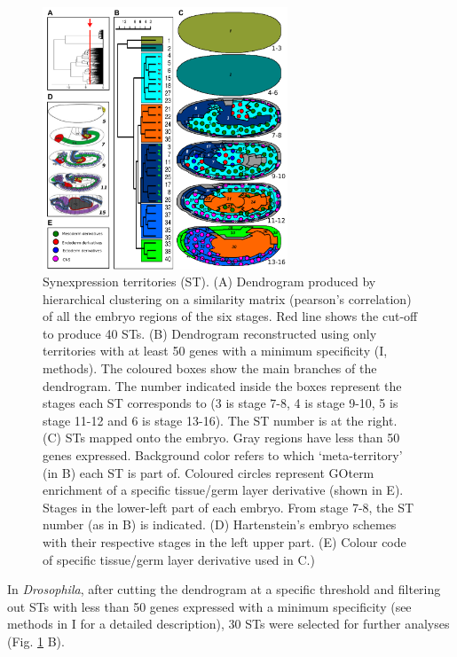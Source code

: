 \begin{figure}[!t]
  \includegraphics[width=0.65\textwidth]{./Images/Art-I/territories.png}
  \centering
  \caption{Synexpression territories (ST). (A) Dendrogram produced by hierarchical clustering on a similarity matrix (pearson's correlation) of all the embryo regions of the six stages. Red line shows the cut-off to produce 40 STs. (B) Dendrogram reconstructed using only territories with at least 50 genes with a minimum specificity (I, methods). The coloured boxes show the main branches of the dendrogram. The number indicated inside the boxes represent the stages each ST corresponds to (3 is stage 7-8, 4 is stage 9-10, 5 is stage 11-12 and 6 is stage 13-16). The ST number is at the right. (C) STs mapped onto the embryo. Gray regions have less than 50 genes expressed. Background color refers to which `meta-territory' (in B) each ST is part of. Coloured circles represent GOterm enrichment of a specific tissue/germ layer derivative (shown in E). Stages in the lower-left part of each embryo. From stage 7-8, the ST number (as in B) is indicated. (D) Hartenstein's embryo schemes \citep{Hartenstein1993} with their respective stages in the left upper part. (E) Colour code of specific tissue/germ layer derivative used in C.)}
  \label{fig:Art-I-territories}
\end{figure}

In \textit{Drosophila}, after cutting the dendrogram at a specific threshold and filtering out STs with less than 50 genes expressed with a minimum specificity (see methods in I for a detailed description), 30 STs were selected for further analyses (Fig. \ref{fig:Art-I-territories} B).

